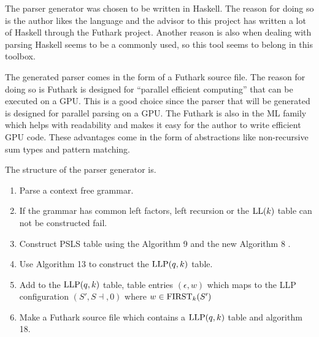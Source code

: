 The parser generator was chosen to be written in Haskell. The reason for doing so is the author likes the language and the advisor to this project has written a lot of Haskell through the Futhark project. Another reason is also when dealing with parsing Haskell seems to be a commonly used, so this tool seems to belong in this toolbox.

The generated parser comes in the form of a Futhark source file. The reason for doing so is Futhark is designed for ``parallel efficient computing'' \cite{futhark:homepage} that can be executed on a GPU. This is a good choice since the parser that will be generated is designed for parallel parsing on a GPU. The Futhark is also in the ML family which helps with readability and makes it easy for the author to write efficient GPU code. These advantages come in the form of abstractions like non-recursive sum types and pattern matching.

The structure of the parser generator is.
\begin{enumerate}
    \item Parse a context free grammar.
    \item If the grammar has common left factors, left recursion or the $\text{LL}(k)$ table can not be constructed fail.
    \item Construct PSLS table using the Algorithm 9 and the new Algorithm 8 \cite[13]{Vagner2007}.
    \item Use Algorithm 13 \cite[13]{Vagner2007} to construct the $\text{LLP}(q, k)$ table.
    \item Add to the $\text{LLP}(q, k)$ table, table entries $(\epsilon, w)$ which maps to the LLP configuration $(S', S \dashv, 0)$ where $w \in \text{FIRST}_k(S')$
    \item Make a Futhark source file which contains a $\text{LLP}(q, k)$ table and algorithm 18.
\end{enumerate}